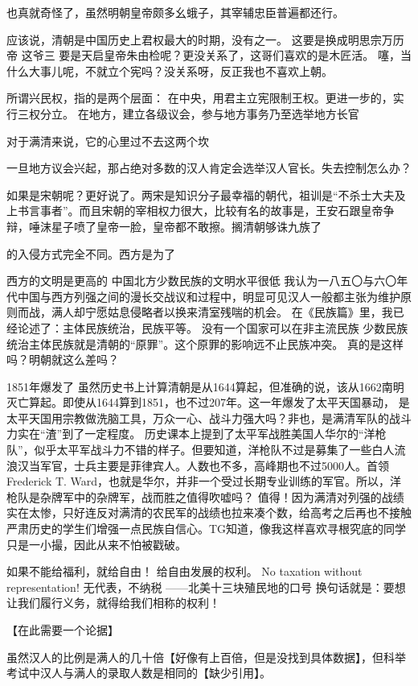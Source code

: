 也真就奇怪了，虽然明朝皇帝颇多幺蛾子，其宰辅忠臣普遍都还行。

应该说，清朝是中国历史上君权最大的时期，没有之一。
这要是换成明思宗万历帝
这爷三
要是天启皇帝朱由检呢？更没关系了，这哥们喜欢的是木匠活。
噻，当什么大事儿呢，不就立个宪吗？没关系呀，反正我也不喜欢上朝。

所谓兴民权，指的是两个层面：
在中央，用君主立宪限制王权。更进一步的，实行三权分立。
在地方，建立各级议会，参与地方事务乃至选举地方长官

对于满清来说，它的心里过不去这两个坎

一旦地方议会兴起，那占绝对多数的汉人肯定会选举汉人官长。失去控制怎么办？

如果是宋朝呢？更好说了。两宋是知识分子最幸福的朝代，祖训是“不杀士大夫及上书言事者”。而且宋朝的宰相权力很大，比较有名的故事是，王安石跟皇帝争辩，唾沫星子喷了皇帝一脸，皇帝都不敢擦。搁清朝够诛九族了


的入侵方式完全不同。西方是为了

西方的文明是更高的
中国北方少数民族的文明水平很低
我认为一八五〇与六〇年代中国与西方列强之间的漫长交战议和过程中，明显可见汉人一般都主张为维护原则而战，满人却宁愿姑息侵略者以换来清室残喘的机会。 
在《民族篇》里，我已经论述了：主体民族统治，民族平等。
没有一个国家可以在非主流民族
少数民族统治主体民族就是清朝的“原罪”。这个原罪的影响远不止民族冲突。
真的是这样吗？明朝就这么差吗？


1851年爆发了
虽然历史书上计算清朝是从1644算起，但准确的说，该从1662南明灭亡算起。即使从1644算到1851，也不过207年。这一年爆发了太平天国暴动，
是太平天国用宗教做洗脑工具，万众一心、战斗力强大吗？非也，是满清军队的战斗力实在“渣”到了一定程度。
历史课本上提到了太平军战胜美国人华尔的“洋枪队”，似乎太平军战斗力不错的样子。但要知道，洋枪队不过是募集了一些白人流浪汉当军官，士兵主要是菲律宾人。人数也不多，高峰期也不过5000人。首领Frederick T. Ward，也就是华尔，并非一个受过长期专业训练的军官。所以，洋枪队是杂牌军中的杂牌军，战而胜之值得吹嘘吗？
值得！因为满清对列强的战绩实在太惨，只好连反对满清的农民军的战绩也拉来凑个数，给高考之后再也不接触严肃历史的学生们增强一点民族自信心。TG知道，像我这样喜欢寻根究底的同学只是一小撮，因此从来不怕被戳破。

如果不能给福利，就给自由！
给自由发展的权利。
No taxation without representation!
无代表，不纳税
——北美十三块殖民地的口号
换句话就是：要想让我们履行义务，就得给我们相称的权利！

【在此需要一个论据】

虽然汉人的比例是满人的几十倍【好像有上百倍，但是没找到具体数据】，但科举考试中汉人与满人的录取人数是相同的【缺少引用】。

